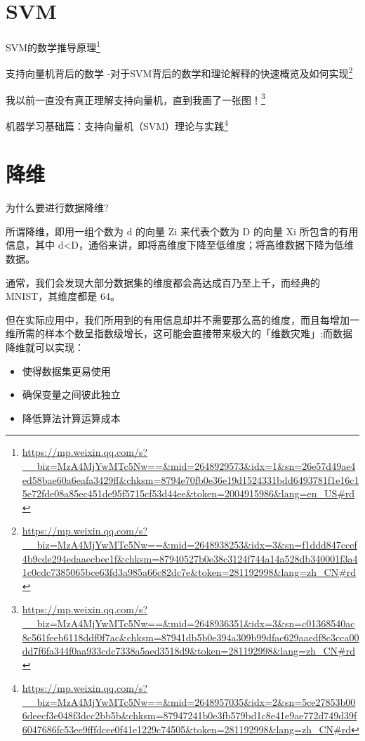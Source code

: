 \documentclass[]{ctexbook}
\renewcommand{\href}[2]{#2\footnote{\url{#1}}}
\begin{document}
\hypertarget{svm}{%
\section{SVM}\label{svm}}

\href{https://mp.weixin.qq.com/s?__biz=MzA4MjYwMTc5Nw==\&mid=2648929573\&idx=1\&sn=26e57d49ae4ed58bae60a6eafa3429ff\&chksm=8794e70fb0e36e19d1524331bdd6493781f1e16c15e72fde08a85ec451de95f5715cf53d44ee\&token=2004915986\&lang=en_US\#rd}{SVM的数学推导原理}

\href{https://mp.weixin.qq.com/s?__biz=MzA4MjYwMTc5Nw==\&mid=2648938253\&idx=3\&sn=f1ddd847ccef4b9cde294edaaecbec1f\&chksm=87940527b0e38c3124f744a14a528db340001f3a41c0cdc7385065bce63fd3a985a66c82dc7e\&token=281192998\&lang=zh_CN\#rd}{支持向量机背后的数学 -对于SVM背后的数学和理论解释的快速概览及如何实现}

\href{https://mp.weixin.qq.com/s?__biz=MzA4MjYwMTc5Nw==\&mid=2648936351\&idx=3\&sn=c01368540ac8c561feeb6118ddf0f7ac\&chksm=87941db5b0e394a309b99dfac629aaedf8c3cca00dd7f6fa344f0aa933cdc7338a5aed3518d9\&token=281192998\&lang=zh_CN\#rd}{我以前一直没有真正理解支持向量机，直到我画了一张图！}

\href{https://mp.weixin.qq.com/s?__biz=MzA4MjYwMTc5Nw==\&mid=2648957035\&idx=2\&sn=5ce27853b006deecf3e048f3dcc2bb5b\&chksm=87947241b0e3fb579bd1c8e41e9ae772d749d39f6047686fc53ee9fffdcee0f41e1229c74505\&token=281192998\&lang=zh_CN\#rd}{机器学习基础篇：支持向量机（SVM）理论与实践}

\hypertarget{ux964dux7ef4}{%
\section{降维}\label{ux964dux7ef4}}

为什么要进行数据降维?

所谓降维，即用一组个数为 d 的向量 Zi 来代表个数为 D 的向量 Xi 所包含的有用信息，其中 d\textless{}D，通俗来讲，即将高维度下降至低维度；将高维数据下降为低维数据。

通常，我们会发现大部分数据集的维度都会高达成百乃至上千，而经典的 MNIST，其维度都是 64。

但在实际应用中，我们所用到的有用信息却并不需要那么高的维度，而且每增加一维所需的样本个数呈指数级增长，这可能会直接带来极大的「维数灾难」;而数据降维就可以实现：

\begin{itemize}
\item
  使得数据集更易使用
\item
  确保变量之间彼此独立
\item
  降低算法计算运算成本
\end{itemize}
\end{document}

